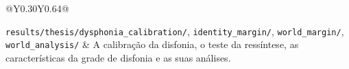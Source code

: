 \begin{apendicesenv}
{\begin{longtable}{@{}Y{0.30\textwidth}Y{0.64\textwidth}@{}}
			\raggedright\texttt{results/\allowbreak thesis/\allowbreak dysphonia\_\allowbreak calibration/}, \texttt{identity\_\allowbreak margin/}, \texttt{world\_\allowbreak margin/}, \texttt{world\_\allowbreak analysis/} & A calibração da disfonia, o teste da ressíntese, as características da grade de disfonia e as suas análises. \\
		\end{longtable}
		}
		\vspace{36pt}

%	
%	
%		
%		
%	
%	

\end{apendicesenv}
